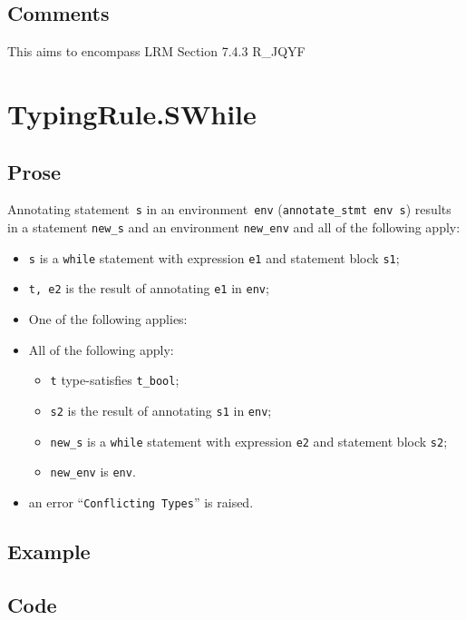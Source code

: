 \documentclass{book}
\begin{document}
\subsection{Comments}
    This aims to encompass LRM Section 7.4.3 R\_JQYF

    
\section{TypingRule.SWhile \label{sec:TypingRule.SWhile}}

  \subsection{Prose}
Annotating statement~\texttt{s} in an environment~\texttt{env}
(\texttt{annotate\_stmt env s}) results in a statement \texttt{new\_s} and an
environment \texttt{new\_env} and all of the following apply:
   \begin{itemize}
   \item \texttt{s} is a \texttt{while} statement with expression \texttt{e1} and statement block \texttt{s1};
   \item \texttt{t, e2} is the result of annotating \texttt{e1} in \texttt{env};
   \item One of the following applies:
     \item All of the following apply:
       \begin{itemize}
       \item \texttt{t} type-satisfies \texttt{t\_bool}; 
       \item \texttt{s2} is the result of annotating \texttt{s1} in \texttt{env};
       \item \texttt{new\_s} is a \texttt{while} statement with expression \texttt{e2} and statement block \texttt{s2};
       \item \texttt{new\_env} is \texttt{env}.
       \end{itemize}
     \item an error ``\texttt{Conflicting Types}'' is raised.
   \end{itemize}

  \subsection{Example}

  \subsection{Code}
\end{document}
